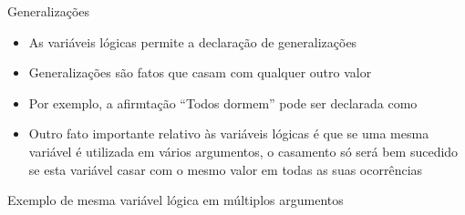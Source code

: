 \begin{frame}[fragile]{Generalizações}

    \begin{itemize}
        \item As variáveis lógicas permite a declaração de generalizações

        \item Generalizações são fatos que casam com qualquer outro valor 

        \item Por exemplo, a afirmtação ``Todos dormem'' pode ser declarada como


        \item Outro fato importante relativo às variáveis lógicas é que se uma mesma variável
            é utilizada em vários argumentos, o casamento só será bem sucedido se esta variável
            casar com o mesmo valor em todas as suas ocorrências
    \end{itemize}

\end{frame}

\begin{frame}[fragile]{Exemplo de mesma variável lógica em múltiplos argumentos}


\end{frame}
